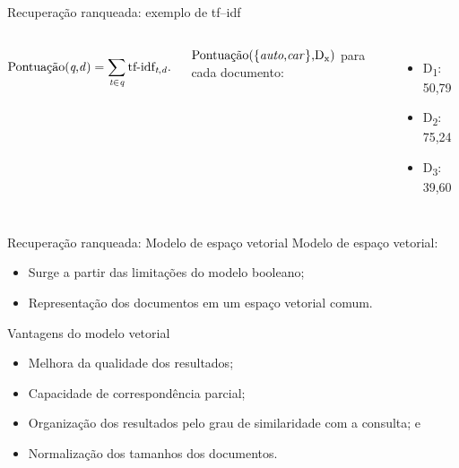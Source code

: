 \documentclass[%
  10pt,%
  aspectratio = 169,%
  compress,%
  t,%
]{beamer}%
\begin{document}
    \begin{frame}[fragile = singleslide]{}{Recuperação ranqueada: exemplo de tf--idf}
        \begin{columns}[t]
            

            \begin{equation}
                \label{eq:pontuação-simples-tf-idf}
                \text{Pontuação(\textit{q},\textit{d})} = \sum_{\textit{t} \in \textit{q}}^{} \text{tf-idf}_{\text{\textit{t},\textit{d}}}.
            \end{equation}

            \vspace{1cm}

            $\text{Pontuação(\{\textit{auto},\textit{car}\},D\textsubscript{x})}$ para cada documento:
            \begin{itemize}
                \setlength\itemsep{-0.2em}
                \item D\textsubscript{1}: 50,79
                \item D\textsubscript{2}: 75,24
                \item D\textsubscript{3}: 39,60
            \end{itemize}
        \end{columns}
    \end{frame}

    \begin{frame}[fragile = singleslide]{}{Recuperação ranqueada: Modelo de espaço vetorial}
        Modelo de espaço vetorial:
        \begin{itemize}
            \item Surge a partir das limitações do modelo booleano;

            \item Representação dos documentos em um espaço vetorial comum.
        \end{itemize}


        \begin{block}{Vantagens do modelo vetorial}
            \begin{itemize}
                \item Melhora da qualidade dos resultados;

                \item Capacidade de correspondência parcial;

                \item Organização dos resultados pelo grau de similaridade com a consulta; e

                \item Normalização dos tamanhos dos documentos.
            \end{itemize}
        \end{block}
    \end{frame}
\end{document}
